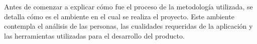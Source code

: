 Antes de comenzar a explicar cómo fue el proceso de la metodología utilizada, se detalla cómo es el ambiente en el cual se realiza el proyecto. Este ambiente contempla el análisis de las personas, las cualidades requeridas de la aplicación y las herramientas utilizadas para el desarrollo del producto.